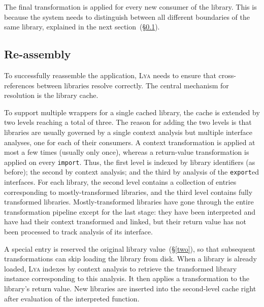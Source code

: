 \documentclass[letterpaper,twocolumn,10pt]{article}
\newcommand{\ttt}[1]{\texttt{#1}}
\newcommand{\sx}[1]{(\S\ref{#1})}
\newcommand{\sys}{{\scshape Lya}\xspace}
\begin{document}
The final transformation is applied for every new consumer of the library.
This is because the system needs to distinguish between all different boundaries of the same library, explained in the next section~\sx{three}.
  

\subsection{Re-assembly}
\label{three}

To successfully reassemble the application, \sys needs to ensure that cross-references between libraries resolve correctly.
The central mechanism for resolution is the library cache.

To support multiple wrappers for a single cached library, the cache is extended by two levels reaching a total of three.
The reason for adding the two levels is that libraries are usually governed by a single context analysis but multiple interface analyses, one for each of their consumers.
A context transformation is applied at most a few times (usually only once), whereas a return-value transformation is applied on every \ttt{import}.
Thus, the first level is indexed by library identifiers (as before); the second by context analysis; and the third by analysis of the \ttt{export}ed interfaces.
For each library, the second level contains a collection of entries corresponding to mostly-transformed libraries, and the third level contains fully transformed libraries.
Mostly-transformed libraries have gone through the entire transformation pipeline except for the last stage:
  they have been interpreted and have had their context transformed and linked, but their return value has not been processed to track analysis of its interface.

A special entry is reserved the original library value~\sx{two}, so that subsequent transformations can skip loading the library from disk.
When a library is already loaded, \sys indexes by context analysis to retrieve the transformed library instance corresponding to this analysis.
It then applies a transformation to the library's return value.
New libraries are inserted into the second-level cache right after evaluation of the interpreted function.
\end{document}
